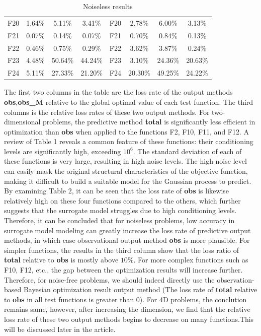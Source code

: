 \documentclass{article}
\begin{document}
\begin{table}[!ht]
{\begin{tabular}{|c|ccc|c|ccc|}
		\cline{1-8}
        F20 & 1.64\% & 5.11\% & 3.41\% & F20 & 2.78\% & 6.00\% & 3.13\% \\ 
        F21 & 0.07\% & 0.14\% & 0.07\% & F21 & 0.70\% & 0.84\% & 0.13\% \\ 
        F22 & 0.46\% & 0.75\% & 0.29\% & F22 & 3.62\% & 3.87\% & 0.24\% \\ 
        F23 & 4.48\% & 50.64\% & 44.24\% & F23 & 3.10\% & 24.36\% & 20.63\% \\ 
        F24 & 5.11\% & 27.33\% & 21.20\% & F24 & 20.30\% & 49.25\% & 24.22\% \\ \hline
    \end{tabular}
	}
	\caption{Noiseless results}
\end{table}

 
  \hspace{2em}The first two columns in the table are the loss rate of the output methods \textbf{obs},\textbf{obs\_M} relative to the global optimal value of each test function. The third columns is the relative loss rates of these two output methods. For two-dimensional problems, the predictive method \textbf{total} is significantly less efficient in optimization than \textbf{obs} when applied to the functions F2, F10, F11, and F12. A review of Table 1 reveals a common feature of these functions: their conditioning levels are significantly high, exceeding $10^6$. The standard deviation of each of these functions is very large, resulting in high noise levels. The high noise level can easily mask the original structural characteristics of the objective function, making it difficult to build a suitable model for the Gaussian process to predict. By examining Table 2, it can be seen that the loss rate of \textbf{obs} is likewise relatively high on these four functions compared to the others, which further suggests that the surrogate model struggles due to high conditioning levels. Therefore, it can be concluded that for noiseless problems, low accuracy in surrogate model modeling can greatly increase the loss rate of predictive output methods, in which case observational output method \textbf{obs} is more plausible. For simpler functions, the results in the third column show that the loss ratio of \textbf{total} relative to \textbf{obs} is mostly above $10\%$. For more complex functions such as F10, F12, etc., the gap between the optimization results will increase further. Therefore, for noise-free problems, we should indeed directly use the observation-based Bayesian optimization result output method (The loss rate of \textbf{total} relative to \textbf{obs} in all test functions is greater than 0). For 4D problems, the conclution remains same, however, after increasing the dimension, we find that the relative loss rate of these two output methods begins to decrease on many functions.This will be discussed later in the article.
\end{document}
